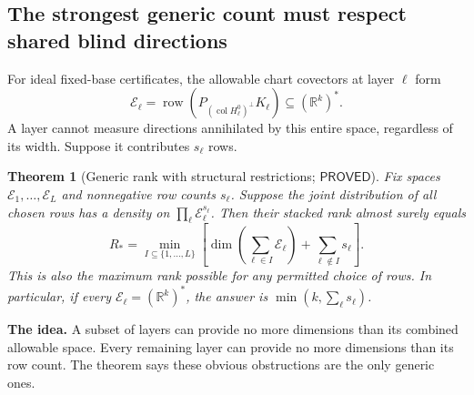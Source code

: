 \documentclass[12pt,a4paper]{article}
\theoremstyle{readable}
\newtheorem{theorem}{Theorem}[section]
\theoremstyle{definition}\newtheorem{example}[theorem]{Example}
\newcommand{\R}{\mathbb R}\newcommand{\rank}{\operatorname{rank}}
\newcommand{\col}{\operatorname{col}}\newcommand{\row}{\operatorname{row}}
\newcommand{\PP}{\mathsf{PROVED}}\newcommand{\FF}{\mathsf{FALSE}}
\newcommand{\idea}[1]{\par\textbf{The idea.} #1\par}
\begin{document}
\subsection{The strongest generic count must respect shared blind directions}
For ideal fixed-base certificates, the allowable chart covectors at layer \(\ell\) form
\[
\mathcal E_\ell=\row(P_{(\col H_\ell^0)^\perp}K_\ell)
\subseteq(\R^k)^*.
\]
A layer cannot measure directions annihilated by this entire space, regardless of its width. Suppose it contributes \(s_\ell\) rows.

\begin{theorem}[Generic rank with structural restrictions; \(\PP\)]\label{thm:rank}
Fix spaces \(\mathcal E_1,\ldots,\mathcal E_L\) and nonnegative row counts \(s_\ell\). Suppose the joint distribution of all chosen rows has a density on \(\prod_\ell\mathcal E_\ell^{s_\ell}\). Then their stacked rank almost surely equals
\begin{equation}\label{eq:minmax}
R_*=\min_{I\subseteq\{1,\ldots,L\}}
\left[\dim\left(\sum_{\ell\in I}\mathcal E_\ell\right)
+\sum_{\ell\notin I}s_\ell\right].
\end{equation}
This is also the maximum rank possible for any permitted choice of rows. In particular, if every \(\mathcal E_\ell=(\R^k)^*\), the answer is
\(\min(k,\sum_\ell s_\ell)\).
\end{theorem}
\idea{A subset of layers can provide no more dimensions than its combined allowable space. Every remaining layer can provide no more dimensions than its row count. The theorem says these obvious obstructions are the only generic ones.}
\end{document}
